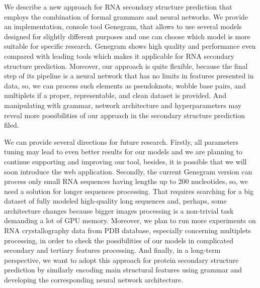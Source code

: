 We describe a new approach for RNA secondary structure prediction that employs the combination of formal grammars and neural networks. We provide an implementation, console tool Genegram, that allows to use several models designed for slightly different purposes and one can choose which model is more suitable for specific research. Genegram shows high quality and performance even compared with leading tools which makes it applicable for RNA secondary structure prediction. Moreover, our approach is quite flexible, because the final step of its pipeline is a neural network that has no limits in features presented in data, so, we can process such elements as pseudoknots, wobble base pairs, and multiplets if a proper, representable, and clean dataset is provided. And manipulating with grammar, network architecture and hyperparameters may reveal more possibilities of our approach in the secondary structure prediction filed.

We can provide several directions for future research. Firstly, all parameters tuning may lead to even better results for our models and we are planning to continue supporting and improving our tool, besides, it is possible that we will soon introduce the web application. Secondly, the current Genegram version can process only small RNA sequences having lengths up to 200 nucleotides, so, we need a solution for longer sequences processing. That requires searching for a big dataset of fully modeled high-quality long sequences and, perhaps, some architecture changes because bigger images processing is a non-trivial task demanding a lot of GPU memory. Moreover, we plan to run more experiments on RNA crystallography data from PDB database, especially concerning multiplets processing, in order to check the possibilities of our models in complicated secondary and tertiary features processing. And finally, in a long-term perspective, we want to adopt this approach for protein secondary structure prediction by similarly encoding main structural features using grammar and developing the corresponding neural network architecture.
